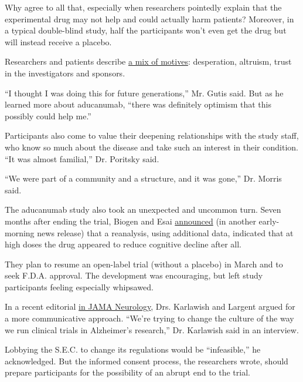 Why agree to all that, especially when researchers pointedly explain
that the experimental drug may not help and could actually harm
patients? Moreover, in a typical double-blind study, half the
participants won't even get the drug but will instead receive a placebo.

Researchers and patients describe
\href{https://n.neurology.org/content/56/6/789}{a mix of motives}:
desperation, altruism, trust in the investigators and sponsors.

``I thought I was doing this for future generations,'' Mr. Gutis said.
But as he learned more about aducanumab, ``there was definitely optimism
that this possibly could help me.''

Participants also come to value their deepening relationships with the
study staff, who know so much about the disease and take such an
interest in their condition. ``It was almost familial,'' Dr. Poritsky
said.

``We were part of a community and a structure, and it was gone,'' Dr.
Morris said.

The aducanumab study also took an unexpected and uncommon turn. Seven
months after ending the trial, Biogen and Esai
\href{http://investors.biogen.com/news-releases/news-release-details/biogen-plans-regulatory-filing-aducanumab-alzheimers-disease}{announced}
(in another early-morning news release) that a reanalysis, using
additional data, indicated that at high doses the drug appeared to
reduce cognitive decline after all.

They plan to resume an open-label trial (without a placebo) in March and
to seek F.D.A. approval. The development was encouraging, but left study
participants feeling especially whipsawed.

In a recent editorial
\href{https://jamanetwork.com/journals/jamaneurology/fullarticle/10.1001/jamaneurol.2019.4974?guestAccessKey=419fcc84-061c-4f77-b240-7ae202352137\&utm_source=For_The_Media\&utm_medium=referral\&utm_campaign=ftm_links\&utm_content=tfl\&utm_term=022020}{in
JAMA Neurology}, Drs. Karlawish and Largent argued for a more
communicative approach. ``We're trying to change the culture of the way
we run clinical trials in Alzheimer's research,'' Dr. Karlawish said in
an interview.

Lobbying the S.E.C. to change its regulations would be ``infeasible,''
he acknowledged. But the informed consent process, the researchers
wrote, should prepare participants for the possibility of an abrupt end
to the trial.

